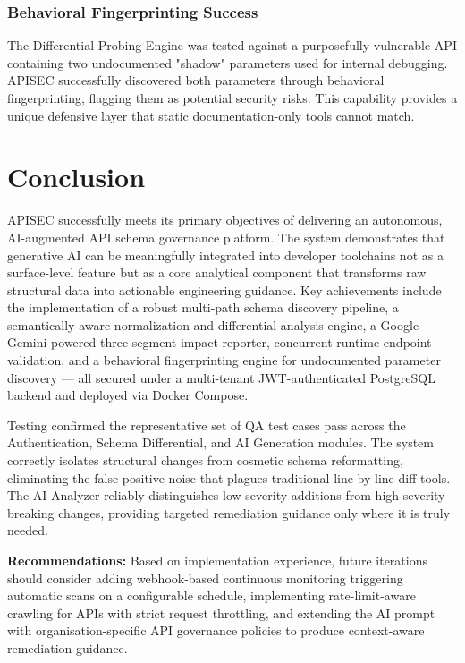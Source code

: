 \documentclass{fisatprojectfinal}
\begin{document}
\subsection{Behavioral Fingerprinting Success}
The Differential Probing Engine was tested against a purposefully vulnerable API containing two undocumented "shadow" parameters used for internal debugging. APISEC successfully discovered both parameters through behavioral fingerprinting, flagging them as potential security risks. This capability provides a unique defensive layer that static documentation-only tools cannot match.

\chapter{Conclusion}
APISEC successfully meets its primary objectives of delivering an autonomous, AI-augmented API schema governance platform. The system demonstrates that generative AI can be meaningfully integrated into developer toolchains not as a surface-level feature but as a core analytical component that transforms raw structural data into actionable engineering guidance. Key achievements include the implementation of a robust multi-path schema discovery pipeline, a semantically-aware normalization and differential analysis engine, a Google Gemini-powered three-segment impact reporter, concurrent runtime endpoint validation, and a behavioral fingerprinting engine for undocumented parameter discovery — all secured under a multi-tenant JWT-authenticated PostgreSQL backend and deployed via Docker Compose.

Testing confirmed the representative set of QA test cases pass across the Authentication, Schema Differential, and AI Generation modules. The system correctly isolates structural changes from cosmetic schema reformatting, eliminating the false-positive noise that plagues traditional line-by-line diff tools. The AI Analyzer reliably distinguishes low-severity additions from high-severity breaking changes, providing targeted remediation guidance only where it is truly needed.

\textbf{Recommendations:} Based on implementation experience, future iterations should consider adding webhook-based continuous monitoring triggering automatic scans on a configurable schedule, implementing rate-limit-aware crawling for APIs with strict request throttling, and extending the AI prompt with organisation-specific API governance policies to produce context-aware remediation guidance.
\end{document}
